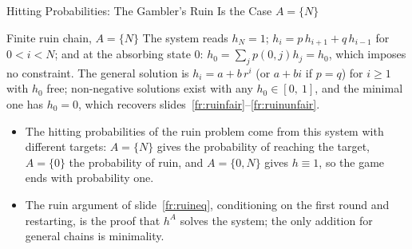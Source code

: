 \begin{frame}{Hitting Probabilities: The Gambler's Ruin Is the Case $A=\{N\}$}
  \label{fr:hittingruin}
  \small
  \begin{exampleblock}{Finite ruin chain, $A=\{N\}$}
    The system reads $h_N=1$; $h_i=p\,h_{i+1}+q\,h_{i-1}$ for $0<i<N$; and at the absorbing state $0$: $h_0=\sum_jp(0,j)h_j=h_0$, which imposes no constraint. The general solution is $h_i=a+b\,r^i$ (or $a+bi$ if $p=q$) for $i\ge1$ with $h_0$ free; non-negative solutions exist with any $h_0\in[0,\ 1]$, and the minimal one has $h_0=0$, which recovers slides~\ref{fr:ruinfair}--\ref{fr:ruinunfair}.
  \end{exampleblock}
  \begin{itemize}
    \item The hitting probabilities of the ruin problem come from this system with different targets: $A=\{N\}$ gives the probability of reaching the target, $A=\{0\}$ the probability of ruin, and $A=\{0,N\}$ gives $h\equiv1$, so the game ends with probability one.
    \item The ruin argument of slide~\ref{fr:ruineq}, conditioning on the first round and restarting, is the proof that $h^A$ solves the system; the only addition for general chains is minimality.
  \end{itemize}
\end{frame}

